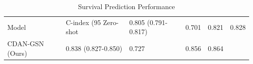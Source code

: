 \begin{table}
\caption{Survival Prediction Performance}
\label{tab:performance}
\begin{tabular}{lllll}
\toprule
Model & C-index (95%
\midrule
Zero-shot & 0.805 (0.791-0.817) & 0.701 & 0.821 & 0.828 \\
CDAN-GSN (Ours) & 0.838 (0.827-0.850) & 0.727 & 0.856 & 0.864 \\
\bottomrule
\end{tabular}
\end{table}
